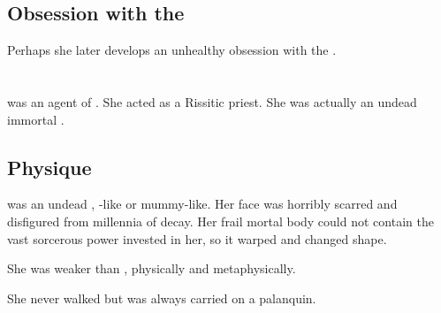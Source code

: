 \subsection{Obsession with the \xss}
Perhaps she later develops an unhealthy obsession with the \xss.
















\section{\TessHanith}
\TessHanith was an agent of \Secherdamon. 
She acted as a Rissitic priest.
She was actually an undead immortal . 









\subsection{Physique}
\TessHanith was an undead , \Lich-like or mummy-like. 
Her face was horribly scarred and disfigured from millennia of decay.
Her frail mortal body could not contain the vast sorcerous power invested in her, so it warped and changed shape.

She was weaker than \LocarPsyrex, physically and metaphysically. 

She never walked but was always carried on a palanquin. 















